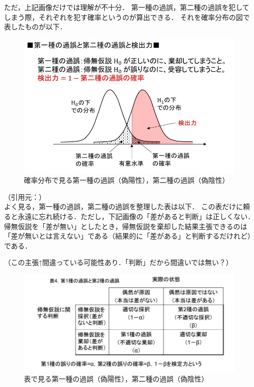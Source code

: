 ただ，上記画像だけでは理解が不十分．
第一種の過誤，第二種の過誤を犯してしまう際，それぞれを犯す確率というのが算出できる．
それを確率分布の図で表したものが以下．

\begin{figure}[H]
  \begin{center}
    \includegraphics[width=15cm]{images/parts/4/pd-type-i-and-type-ii-errors.jpeg}
    \caption{確率分布で見る第一種の過誤（偽陽性），第二種の過誤（偽陰性）}
  \end{center}
\end{figure}

（引用元：）\\

よく見る，第一種の過誤，第二種の過誤を整理した表は以下．
この表だけに頼ると永遠に忘れ続ける．ただし，下記画像の「差があると判断」は正しくない．
帰無仮説を「差が無い」としたとき，帰無仮説を棄却した結果主張できるのは「差が無いとは言えない」である（結果的に「差がある」と判断するだけれど）である．

（この主張↑間違っている可能性あり．「判断」だから間違いでは無い？）

\begin{figure}[H]
  \begin{center}
    \includegraphics[width=15cm]{images/parts/4/table-type-i-and-type-ii-errors.jpeg}
    \caption{表で見る第一種の過誤（偽陽性），第二種の過誤（偽陰性）}
  \end{center}
\end{figure}


